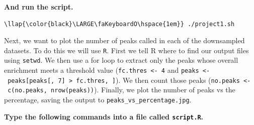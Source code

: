 \documentclass[11pt]{article}
\begin{document}
    \textbf{And run the script.}

\begin{terminalinput}
\begin{Verbatim}[commandchars=\\\{\}]
\llap{\color{black}\LARGE\faKeyboardO\hspace{1em}} ./project1.sh
\end{Verbatim}
\end{terminalinput}


    Next, we want to plot the number of peaks called in each of the
downsampled datasets. To do this we will use \texttt{R}. First we tell R
where to find our output files using \texttt{setwd}. We then use a for
loop to extract only the peaks whose overall enrichment meets a
threshold value (\texttt{fc.thres\ \textless{}-\ 4} and
\texttt{peaks\ \textless{}-\ peaks{[}peaks{[},\ 7{]}\ \textgreater{}\ fc.thres,\ {]}}).
We then count those peaks
(\texttt{no.peaks\ \textless{}-\ c(no.peaks,\ nrow(peaks))}). Finally,
we plot the number of peaks vs the percentage, saving the output to
\texttt{peaks\_vs\_percentage.jpg}.

\newpage

    \textbf{Type the following commands into a file called
\texttt{script.R}.}
\end{document}
